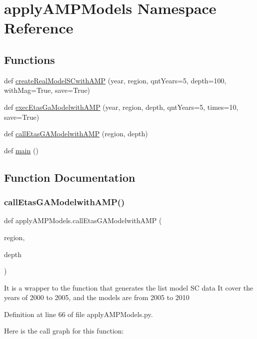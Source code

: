 \hypertarget{namespaceapply_a_m_p_models}{}\section{apply\+A\+M\+P\+Models Namespace Reference}
\label{namespaceapply_a_m_p_models}
\subsection*{Functions}
\begin{DoxyCompactItemize}
\item 
def \hyperlink{namespaceapply_a_m_p_models_a218d77d360b185cadb5259817ba571e6}{create\+Real\+Model\+S\+Cwith\+A\+MP} (year, region, qnt\+Years=5, depth=100, with\+Mag=True, save=True)
\item 
def \hyperlink{namespaceapply_a_m_p_models_a6e13ecf7e54815eee256d843a82a01bc}{exec\+Etas\+Ga\+Modelwith\+A\+MP} (year, region, depth, qnt\+Years=5, times=10, save=True)
\item 
def \hyperlink{namespaceapply_a_m_p_models_a40fba49cf9233b9c4a2d2858cacec6a3}{call\+Etas\+G\+A\+Modelwith\+A\+MP} (region, depth)
\item 
def \hyperlink{namespaceapply_a_m_p_models_ac1922194d435449fb9ccda62eafbf5dc}{main} ()
\end{DoxyCompactItemize}


\subsection{Function Documentation}
\mbox{\label{namespaceapply_a_m_p_models_a40fba49cf9233b9c4a2d2858cacec6a3}} 
\subsubsection{\texorpdfstring{call\+Etas\+G\+A\+Modelwith\+A\+M\+P()}{callEtasGAModelwithAMP()}}
{\footnotesize\ttfamily def apply\+A\+M\+P\+Models.\+call\+Etas\+G\+A\+Modelwith\+A\+MP (\begin{DoxyParamCaption}\item[{}]{region,  }\item[{}]{depth }\end{DoxyParamCaption})}

\begin{DoxyVerb}It is a wrapper to the function that generates the list model SC data
It cover the years of 2000 to 2005, and the models are from 2005 to 2010
\end{DoxyVerb}
 

Definition at line 66 of file apply\+A\+M\+P\+Models.\+py.

Here is the call graph for this function\+:

